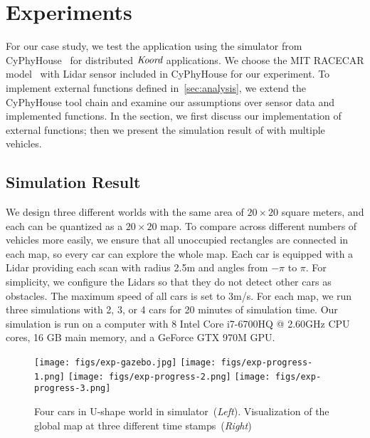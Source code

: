 \newcommand{\Koord}{\ensuremath{\lgname}\xspace}
\newcommand{\CyPhyHouse}{CyPhyHouse\xspace}
\newcommand{\Gazebo}{Gazebo\xspace}

\newcommand{\ScanToMap}{\ensuremath{\mathit{scanToMap}}\xspace}
\newcommand{\TSync}{\ensuremath{\mathit{tSync}}\xspace}
\newcommand{\PathToFrontier}{\ensuremath{\mathit{pickPathToFrontier}}\xspace}

\section{Experiments}
\label{sec:experiments}


For our case study, we test the \dmap application using the simulator from \CyPhyHouse~\cite{ghosh2019cyphyhouse} for distributed \Koord applications.
We choose the MIT RACECAR model~\cite{MIT_RACECAR} with Lidar sensor included in \CyPhyHouse for our experiment.
To implement external functions defined in~\ref{sec:analysis},
we extend the \CyPhyHouse tool chain and examine our assumptions over sensor data and implemented functions.
In the section, we first discuss our implementation of external functions;
then we present the simulation result of \dmap with multiple vehicles.

\subsection{Simulation Result}

We design three different worlds with the same area of $20\times20$ square meters,
and each can be quantized as a $20 \times 20$ map.
To compare across different numbers of vehicles more easily,
we ensure that all unoccupied rectangles are connected in each map,
so every car can explore the whole map.
Each car is equipped with a Lidar providing each scan with radius 2.5m and angles from $-\pi$ to $\pi$.
For simplicity, we configure the Lidars so that they do not detect other cars as obstacles.
The maximum speed of all cars is set to 3m/s.
For each map, we run three simulations with 2, 3, or 4 cars for 20 minutes of simulation time.
Our simulation is run on a computer with 8 Intel Core i7-6700HQ @ 2.60GHz CPU cores, 16 GB main memory, and a GeForce GTX 970M GPU.

\begin{figure}
\texttt{[image: figs/exp-gazebo.jpg]}
\texttt{[image: figs/exp-progress-1.png]}
\texttt{[image: figs/exp-progress-2.png]}
\texttt{[image: figs/exp-progress-3.png]}
\caption{Four cars in U-shape world in simulator~(\emph{Left}). Visualization of the global map at three different time stamps~(\emph{Right})}\label{fig:U-map-progress}
\end{figure}

